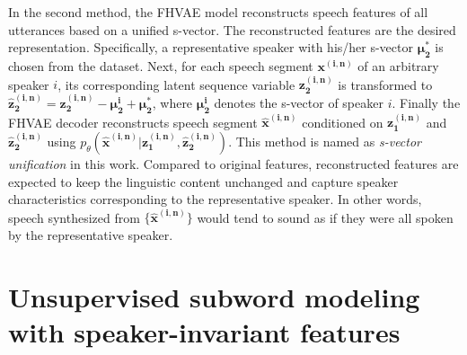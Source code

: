 \documentclass[a4paper]{article}
\begin{document}
In the second method, the FHVAE model reconstructs speech features of all utterances based on a unified s-vector. The reconstructed features are the desired representation.
Specifically, a representative speaker with his/her s-vector $\bm{\mu_2^*}$ is chosen from the dataset. Next, for each speech segment $\bm{x^{(i,n)}}$ of an arbitrary speaker $i$, its corresponding latent sequence variable $\bm{z_2^{(i,n)}}$ is transformed to $\bm{\hat{z}_2^{(i,n)}}=\bm{z_2^{(i,n)}}-\bm{\mu_2^i}+\bm{\mu_2^*}$, where $\bm{\mu_2^{i}}$ denotes the s-vector of speaker $i$. 
Finally the FHVAE decoder reconstructs speech segment $\bm{\hat{x}^{(i,n)}}$ conditioned on $\bm{z_1^{(i,n)}}$ and $ \bm{\hat{z}_2^{(i,n)}}$ using $p_{\theta}(\bm{\hat{x}^{(i,n)}}|\bm{z_1 ^{(i,n)}, \bm{\hat{z}_2^{(i,n)}}})$. This method is named as \emph{s-vector unification} in this work.
Compared to original features,  reconstructed features  are expected to keep the  linguistic content unchanged and capture speaker characteristics corresponding to the representative speaker. In other words, speech synthesized from $\{\bm{\hat{x}^{(i,n)}}\}$ would tend to sound as if they were all spoken by the representative speaker. 

\section{Unsupervised subword modeling with speaker-invariant features}
\end{document}
